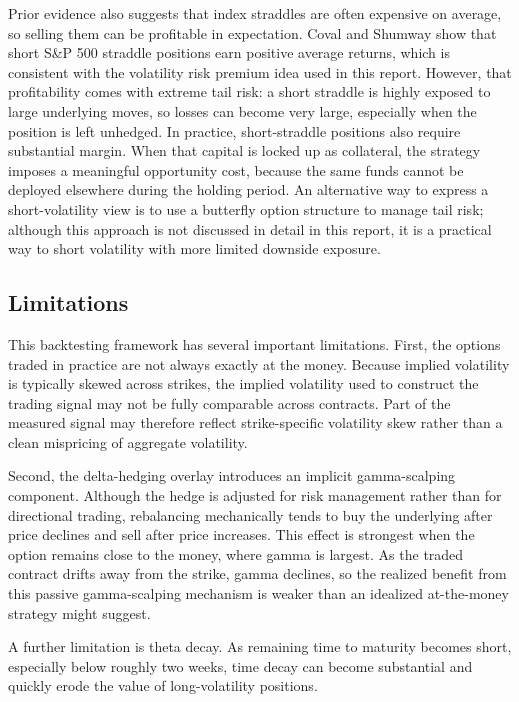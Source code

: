 ﻿\documentclass{article}
\begin{document}
Prior evidence also suggests that index straddles are often expensive on average, so selling them can be profitable in expectation. Coval and Shumway \cite{coval2001} show that short S\&P 500 straddle positions earn positive average returns, which is consistent with the volatility risk premium idea used in this report. However, that profitability comes with extreme tail risk: a short straddle is highly exposed to large underlying moves, so losses can become very large, especially when the position is left unhedged. In practice, short-straddle positions also require substantial margin. When that capital is locked up as collateral, the strategy imposes a meaningful opportunity cost, because the same funds cannot be deployed elsewhere during the holding period. An alternative way to express a short-volatility view is to use a butterfly option structure to manage tail risk; although this approach is not discussed in detail in this report, it is a practical way to short volatility with more limited downside exposure.

\subsection{Limitations}
This backtesting framework has several important limitations. First, the options traded in practice are not always exactly at the money. Because implied volatility is typically skewed across strikes, the implied volatility used to construct the trading signal may not be fully comparable across contracts. Part of the measured signal may therefore reflect strike-specific volatility skew rather than a clean mispricing of aggregate volatility.

Second, the delta-hedging overlay introduces an implicit gamma-scalping component. Although the hedge is adjusted for risk management rather than for directional trading, rebalancing mechanically tends to buy the underlying after price declines and sell after price increases. This effect is strongest when the option remains close to the money, where gamma is largest. As the traded contract drifts away from the strike, gamma declines, so the realized benefit from this passive gamma-scalping mechanism is weaker than an idealized at-the-money strategy might suggest.

A further limitation is theta decay. As remaining time to maturity becomes short, especially below roughly two weeks, time decay can become substantial and quickly erode the value of long-volatility positions.
\end{document}
